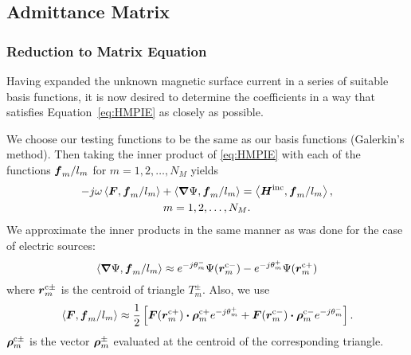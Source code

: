 \subsection{Admittance Matrix}
\subsubsection{Reduction to Matrix Equation}
Having expanded the unknown magnetic surface 
current in a series of suitable basis functions, 
it is now desired to determine the coefficients in a way that satisfies 
Equation~\eqref{eq:HMPIE} as closely as possible.  

We choose our testing functions to be the same as our basis functions 
(Galerkin's method).  Then taking the inner product of \eqref{eq:HMPIE}
with each of the functions $\boldsymbol{f}_m/l_m$  for $m = 1,2,\ldots, N_M$ yields
\begin{multline}
  -j\omega \left< \boldsymbol{F},\boldsymbol{f}_m/l_m \right> + \left< \boldsymbol{\nabla}\Psi,\boldsymbol{f}_m/l_m \right>
  = \left< \boldsymbol{H}^{\text{inc}}, \boldsymbol{f}_m/l_m \right>, \\
  m = 1, 2, \ldots,  N_M.   \label{eq:Hmom}
\end{multline}  
We approximate the inner products in the same manner as was done for
the case of electric sources:
\begin{equation}
  \left< \boldsymbol{\nabla}\Psi, \boldsymbol{f}_m/l_m \right> \approx 
         e^{-j\theta_m^-} \Psi(\boldsymbol{r}^{\text{c}-}_m) - e^{-j\theta_m^+} \Psi(\boldsymbol{r}^{\text{c}+}_m)  
         \label{eq:Psimom}
\end{equation}
where $\boldsymbol{r}^{\text{c}\pm}_m$ is the centroid of triangle $T_m^{\pm}$. Also, we use
\begin{equation}
  \left< \boldsymbol{F}, \boldsymbol{f}_m/l_m \right> \approx \frac{1}{2} 
      \left[ \boldsymbol{F}(\boldsymbol{r}^{\text{c}+}_m) \boldsymbol{\cdot} \boldsymbol{\rho}^{\text{c}+}_m e^{-j\theta_m^+} +  
             \boldsymbol{F}(\boldsymbol{r}^{\text{c}-}_m) \boldsymbol{\cdot} \boldsymbol{\rho}^{\text{c}-}_m  e^{-j\theta_m^-}
      \right].      \label{eq:Fmom}
\end{equation}  
$\boldsymbol{\rho}^{\text{c}\pm}_m$ is the vector $\boldsymbol{\rho}_m^{\pm}$ evaluated at the centroid
of the corresponding triangle.


